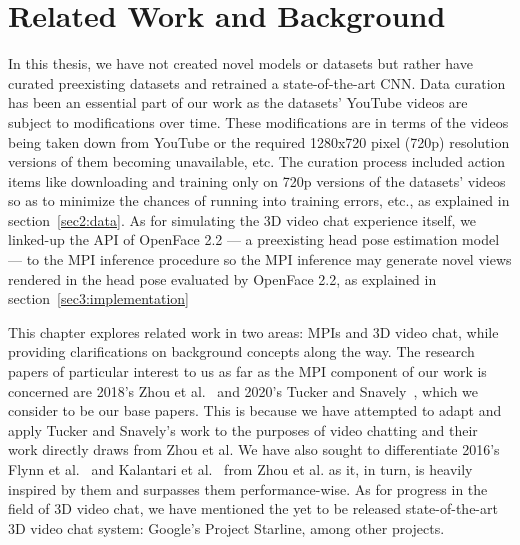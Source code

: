 \chapter{Related Work and Background}\label{ch2:related-work-background}

In this thesis, we have not created novel models or datasets but rather have curated preexisting datasets and retrained a state-of-the-art CNN. Data curation has been an essential part of our work as the datasets' YouTube videos are subject to modifications over time. These modifications are in terms of the videos being taken down from YouTube or the required 1280x720 pixel (720p) resolution versions of them becoming unavailable, etc. The curation process included action items like downloading and training only on 720p versions of the datasets' videos so as to minimize the chances of running into training errors, etc., as explained in section~\ref{sec2:data}. As for simulating the 3D video chat experience itself, we linked-up the API of OpenFace 2.2 --- a preexisting head pose estimation model --- to the MPI inference procedure so the MPI inference may generate novel views rendered in the head pose evaluated by OpenFace 2.2, as explained in section~\ref{sec3:implementation}

This chapter explores related work in two areas: MPIs and 3D video chat, while providing clarifications on background concepts along the way. The research papers of particular interest to us as far as the MPI component of our work is concerned are 2018's Zhou et al.~\cite{zhou2018stereo} and 2020's Tucker and Snavely~\cite{single_view_mpi}, which we consider to be our base papers. This is because we have attempted to adapt and apply Tucker and Snavely's work to the purposes of video chatting and their work directly draws from Zhou et al. We have also sought to differentiate 2016's Flynn et al.~\cite{deep_stereo_2016} and Kalantari et al.~\cite{kalantari_2016} from Zhou et al. as it, in turn, is heavily inspired by them and surpasses them performance-wise. As for progress in the field of 3D video chat, we have mentioned the yet to be released state-of-the-art 3D video chat system: Google's Project Starline, among other projects.

